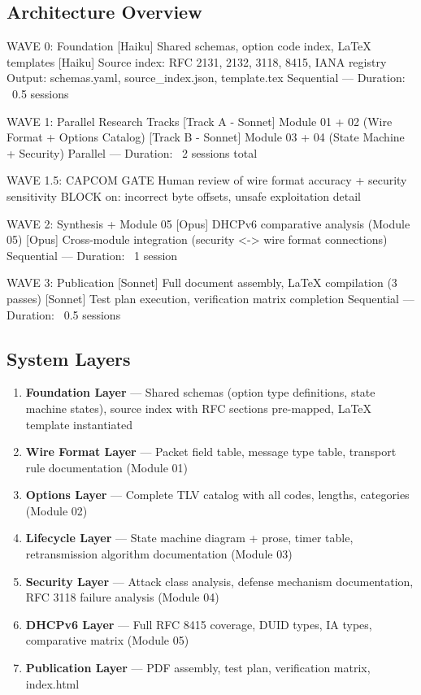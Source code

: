 \documentclass[11pt,letterpaper]{article}
\begin{document}
\subsection{Architecture Overview}

\begin{asciibox}
WAVE 0: Foundation
  [Haiku] Shared schemas, option code index, LaTeX templates
  [Haiku] Source index: RFC 2131, 2132, 3118, 8415, IANA registry
  Output: schemas.yaml, source_index.json, template.tex
  Sequential --- Duration: ~0.5 sessions

WAVE 1: Parallel Research Tracks
  [Track A - Sonnet] Module 01 + 02 (Wire Format + Options Catalog)
  [Track B - Sonnet] Module 03 + 04 (State Machine + Security)
  Parallel --- Duration: ~2 sessions total

WAVE 1.5: CAPCOM GATE
  Human review of wire format accuracy + security sensitivity
  BLOCK on: incorrect byte offsets, unsafe exploitation detail

WAVE 2: Synthesis + Module 05
  [Opus] DHCPv6 comparative analysis (Module 05)
  [Opus] Cross-module integration (security <-> wire format connections)
  Sequential --- Duration: ~1 session

WAVE 3: Publication
  [Sonnet] Full document assembly, LaTeX compilation (3 passes)
  [Sonnet] Test plan execution, verification matrix completion
  Sequential --- Duration: ~0.5 sessions
\end{asciibox}

\subsection{System Layers}

\begin{enumerate}[noitemsep]
  \item \textbf{Foundation Layer} --- Shared schemas (option type definitions, state machine states), source index with RFC sections pre-mapped, LaTeX template instantiated
  \item \textbf{Wire Format Layer} --- Packet field table, message type table, transport rule documentation (Module 01)
  \item \textbf{Options Layer} --- Complete TLV catalog with all codes, lengths, categories (Module 02)
  \item \textbf{Lifecycle Layer} --- State machine diagram + prose, timer table, retransmission algorithm documentation (Module 03)
  \item \textbf{Security Layer} --- Attack class analysis, defense mechanism documentation, RFC 3118 failure analysis (Module 04)
  \item \textbf{DHCPv6 Layer} --- Full RFC 8415 coverage, DUID types, IA types, comparative matrix (Module 05)
  \item \textbf{Publication Layer} --- PDF assembly, test plan, verification matrix, index.html
\end{enumerate}
\end{document}
